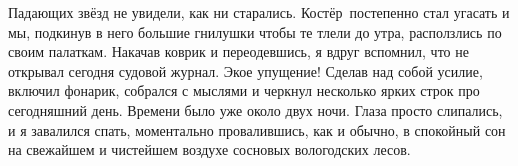 Падающих звёзд не увидели, как ни старались. Костёр~постепенно стал угасать и мы, подкинув в него большие гнилушки чтобы те тлели до утра, расползлись по своим палаткам. Накачав коврик и переодевшись, я вдруг вспомнил, что не открывал сегодня судовой журнал. Экое упущение! Сделав над собой усилие, включил фонарик, собрался с мыслями и черкнул несколько ярких строк про сегодняшний день. Времени было уже около двух ночи. Глаза просто слипались, и я завалился спать, моментально провалившись, как и обычно, в спокойный сон на свежайшем и чистейшем воздухе сосновых вологодских лесов.

\begin{center}
\end{center}
